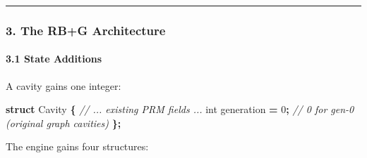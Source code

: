 \documentclass[
  11pt,
  a4paper,
]{article}
\newenvironment{Shaded}{\begin{snugshade}}{\end{snugshade}}
\newcommand{\CommentTok}[1]{\textcolor[rgb]{0.56,0.35,0.01}{\textit{#1}}}
\newcommand{\DataTypeTok}[1]{\textcolor[rgb]{0.13,0.29,0.53}{#1}}
\newcommand{\DecValTok}[1]{\textcolor[rgb]{0.00,0.00,0.81}{#1}}
\newcommand{\KeywordTok}[1]{\textcolor[rgb]{0.13,0.29,0.53}{\textbf{#1}}}
\newcommand{\NormalTok}[1]{#1}
\newcommand{\OperatorTok}[1]{\textcolor[rgb]{0.81,0.36,0.00}{\textbf{#1}}}
\begin{document}
\begin{center}\rule{0.5\linewidth}{0.5pt}\end{center}

\subsubsection{3. The RB+G Architecture}\label{the-rbg-architecture}

\paragraph{3.1 State Additions}\label{state-additions}

A cavity gains one integer:

\begin{Shaded}
\begin{Highlighting}[]
\KeywordTok{struct}\NormalTok{ Cavity }\OperatorTok{\{}
    \CommentTok{// ... existing PRM fields ...}
    \DataTypeTok{int}\NormalTok{   generation    }\OperatorTok{=} \DecValTok{0}\OperatorTok{;}   \CommentTok{// 0 for gen{-}0 (original graph cavities)}
\OperatorTok{\};}
\end{Highlighting}
\end{Shaded}

The engine gains four structures:
\end{document}
